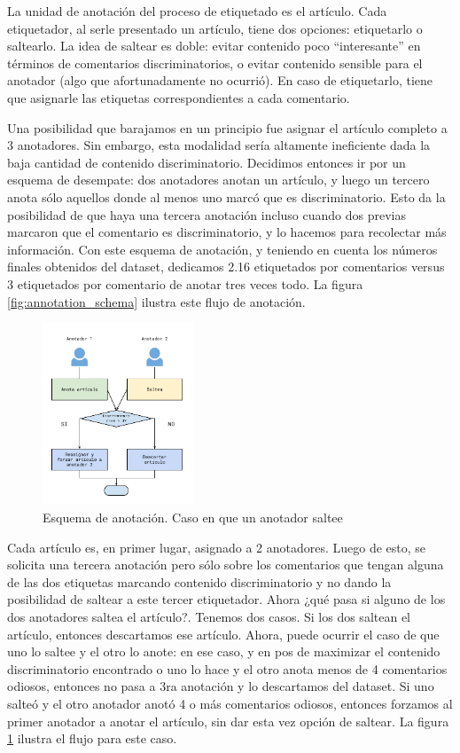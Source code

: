 La unidad de anotación del proceso de etiquetado es el artículo. Cada etiquetador, al serle presentado un artículo, tiene dos opciones: etiquetarlo o saltearlo. La idea de saltear es doble: evitar contenido poco ``interesante'' en términos de comentarios discriminatorios, o evitar contenido sensible para el anotador (algo que afortunadamente no ocurrió). En caso de etiquetarlo, tiene que asignarle las etiquetas correspondientes a cada comentario.

Una posibilidad que barajamos en un principio fue asignar el artículo completo a 3 anotadores. Sin embargo, esta modalidad sería altamente ineficiente dada la baja cantidad de contenido discriminatorio. Decidimos entonces ir por un esquema de desempate: dos anotadores anotan un artículo, y luego un tercero anota sólo aquellos donde al menos uno marcó que es discriminatorio. Esto da la posibilidad de que haya una tercera anotación incluso cuando dos previas marcaron que el comentario es discriminatorio, y lo hacemos para recolectar más información. Con este esquema de anotación, y teniendo en cuenta los números finales obtenidos del dataset, dedicamos 2.16 etiquetados por comentarios versus 3 etiquetados por comentario de anotar tres veces todo. La figura \ref{fig:annotation_schema} ilustra este flujo de anotación.


\begin{figure}
    \centering
    \includegraphics[width=0.4\textwidth]{img/esquema_anotacion_caso_2.pdf}
    \caption{Esquema de anotación. Caso en que un anotador saltee}
    \label{fig:annotation_schema_case_two}
\end{figure}

Cada artículo es, en primer lugar, asignado a 2 anotadores. Luego de esto, se solicita una tercera anotación pero sólo sobre los comentarios que tengan alguna de las dos etiquetas marcando contenido discriminatorio y no dando la posibilidad de saltear a este tercer etiquetador. Ahora ¿qué pasa si alguno de los dos anotadores saltea el artículo?. Tenemos dos casos. Si los dos saltean el artículo, entonces descartamos ese artículo. Ahora, puede ocurrir el caso de que uno lo saltee y el otro lo anote: en ese caso, y en pos de maximizar el contenido discriminatorio encontrado o uno lo hace y el otro anota menos de 4 comentarios odiosos, entonces no pasa a 3ra anotación y lo descartamos del dataset. Si uno salteó y el otro anotador anotó 4 o más comentarios odiosos, entonces forzamos al primer anotador a anotar el artículo, sin dar esta vez opción de saltear. La figura \ref{fig:annotation_schema_case_two} ilustra el flujo para este caso.


